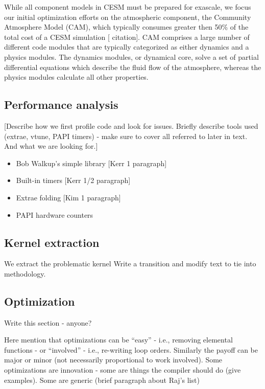 While all component models in CESM must be prepared for exascale, we focus our initial 
optimization efforts on the atmospheric component, the Community Atmosphere Model (CAM), which typically consumes greater then 50\% of the total cost of a CESM simulation [{\color{red} citation}].  CAM comprises a large number of different code modules that are typically  categorized as either dynamics and a physics modules.  The dynamics modules, or dynamical core, solve a set of partial differential equations which describe the fluid flow of the atmosphere, whereas the physics modules calculate all other properties.  




\subsection{Performance analysis}\label{sec:perf}

[{\color{red}Describe how we first profile code and look for issues.  Briefly describe tools used (extrae, vtune, PAPI timers) - make sure to cover all referred to later in text.  And what we are looking for.}]

{\color{red}
 \begin{itemize}
   \item {Bob Walkup's simple library} [Kerr 1 paragraph]
   \item {Built-in timers} [Kerr 1/2 paragraph]
   \item {Extrae folding} [Kim 1 paragraph]
 \item PAPI hardware counters \cite{papi}
 \end{itemize}
}


\subsection{Kernel extraction}

We extract the problematic kernel {\color{red} Write a transition and modify text to tie into methodology}.  



\subsection{Optimization}

 {\color{red} Write this section - anyone?}

Here mention that optimizations can be ``easy'' - i.e., removing elemental functions - or ``involved'' - i.e., re-writing loop orders.  Similarly the payoff can be major or minor (not necessarily proportional to work involved).
Some optimizations are innovation - some are things the compiler should do (give examples).  Some are generic (brief paragraph about Raj's list)


